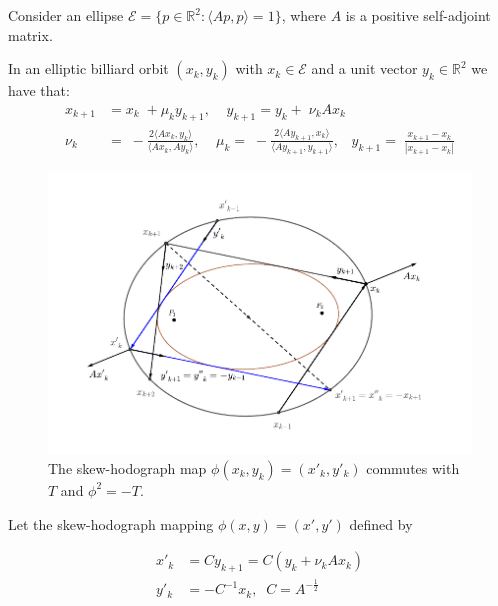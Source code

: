 Consider an ellipse $\mathcal{E}=\{p\in \mathbb{R}^2:  \langle Ap,p\rangle=1\}$, where  $A$ is a positive  self-adjoint matrix.

In an elliptic billiard orbit $ (x_k,y_k)$ with $x_k\in\mathcal{E}$ and a unit vector $y_k\in \mathbb{R}^2$ we have that:
\begin{align*}
	x_{k+1} &=x_k\;+\mu_k y_{k+1},\;\;\;\;
	y_{k+1} =y_k+\; \nu_k Ax_{k}\\
	\nu_k &=\;-\frac{2\langle Ax_k,y_k\rangle}{\langle Ax_{k},Ay_{k}\rangle},\;\;\;\;
	\mu_k  =\;-\frac{2\langle Ay_{k+1},x_k\rangle}{\langle Ay_{k+1},y_{k+1}\rangle},\;\;\;
	y_{k+1}  =\;\frac{x_{k+1}-x_k}{|x_{k+1}-x_k|}
\end{align*}
\begin{figure} 
\begin{center}
\includegraphics[scale=0.8]{chap_09/pics/pics_09_030_veselov2.pdf}
\caption{The skew-hodograph map $\phi(x_k,y_k)=(x'_k,y'_k)$ commutes with $T$ and $\phi^2=-T$.}
\end{center}
\end{figure}
   
 
 

Let the skew-hodograph mapping $\phi(x,y)=(x',y')$ defined by

\begin{align}
    x'_k&=Cy_{k+1}=C(y_k+\nu_k Ax_k)\nonumber \\
    y'_k&=-C^{-1}x_k, \;\; C=A^{-\frac{1}{2}}
    \label{eq:hodrog}
\end{align}

